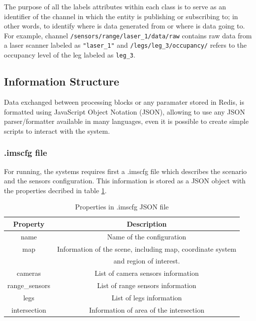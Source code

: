 The purpose of all the labels attributes within each class is to serve as an identifier of the channel in which the entity is publishing or subscribing to; in other words, to identify where is data generated from or where is data going to. For example, channel \texttt{/sensors/range/laser\_1/data/raw} contains raw data from a laser scanner labeled as \texttt{"laser\_1"} and \texttt{/legs/leg\_3/occupancy/} refers to the occupancy level of the leg labeled as \texttt{leg\_3}.

\subsection{Information Structure}

Data exchanged between processing blocks or any paramater stored in Redis, is formatted using JavaScript Object Notation (JSON), allowing to use any JSON parser/formatter available in many languages, even it is possible to create simple scripts to interact with the system.

\subsubsection{.imscfg file}

For running, the systems requires first a .imscfg file which describes the scenario and the sensors configuration. This information is stored as a JSON object with the properties decribed in table \ref{imscfg_file}.

\begin{table}[ht!]
\footnotesize
\centering
\begin{tabular}{|c | c|}
\hline
\textbf{Property} & \textbf{Description} \\
\hline
name & Name of the configuration \\
\hline
map & Information of the scene, including map, coordinate system \\ 
 & and region of interest. \\
\hline
cameras & List of camera sensors information \\
\hline
range\_sensors & List of range sensors information \\
\hline
legs & List of legs information \\
\hline
intersection & Information of area of the intersection \\
\hline
\end{tabular}
\caption{Properties in .imscfg JSON file}
\label{imscfg_file}
\end{table}

